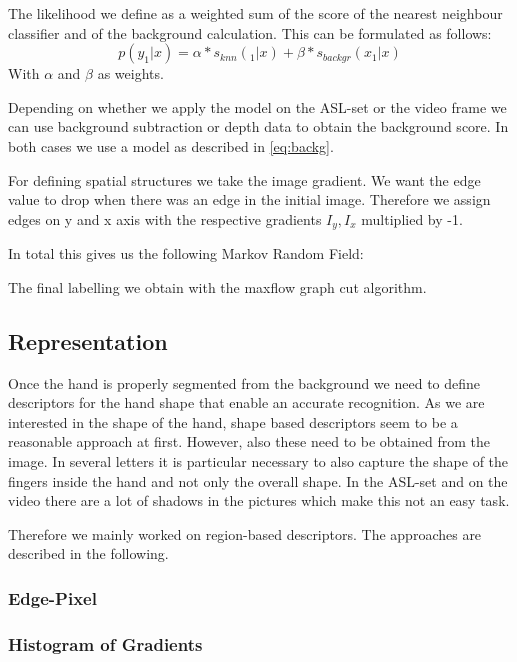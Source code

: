 \documentclass[letterpaper, 10 pt, conference]{ieeeconf}  %
\begin{document}
The likelihood we define as a weighted sum of the score of the nearest neighbour classifier and of the background calculation. This can be formulated as follows:
\begin{equation}
p(y_1 | x) = \alpha * s_{knn}(_1 | x) + \beta * s_{backgr}(x_1 | x) 
\end{equation}
With $\alpha$ and $\beta$ as weights.

Depending on whether we apply the model on the ASL-set or the video frame we can use background subtraction or depth data to obtain the background score. In both cases we use a model as described in \autoref{eq:backg}.

For defining spatial structures we take the image gradient. We want the edge value to drop when there was an edge in the initial image. Therefore we assign edges on y and x axis with the respective gradients $I_y, I_x$ multiplied by -1.

In total this gives us the following Markov Random Field:
\begin{center}



\end{center}

The final labelling we obtain with the maxflow graph cut algorithm.


\subsection{Representation}

Once the hand is properly segmented from the background we need to define descriptors for the hand shape that enable an accurate recognition. As we are interested in the shape of the hand, shape based descriptors seem to be a reasonable approach at first. However, also these need to be obtained from the image. In several letters it is particular necessary to also capture the shape of the fingers inside the hand and not only the overall shape. In the ASL-set and on the video there are a lot of shadows in the pictures which make this not an easy task.

Therefore we mainly worked on region-based descriptors. The approaches are described in the following.

\subsubsection{Edge-Pixel}

\subsubsection{Histogram of Gradients}
\end{document}
